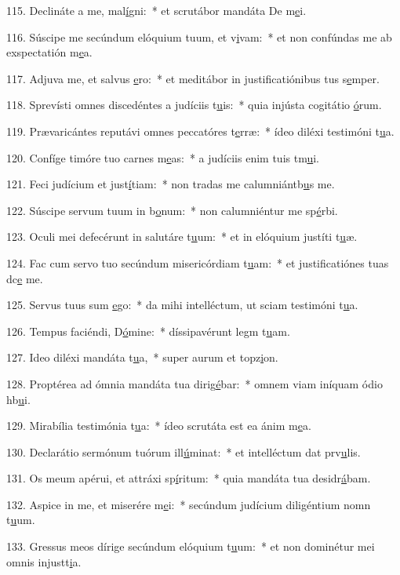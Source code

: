 115. Declináte a me, mal\uline{í}gni:~* et scrutábor mandáta De m\uline{e}i.\par 
116. Súscipe me secúndum elóquium tuum, et v\uline{i}vam:~* et non confúndas me ab exspectatión m\uline{e}a.\par 
117. Adjuva me, et salvus \uline{e}ro:~* et meditábor in justificatiónibus tus s\uline{e}mper.\par 
118. Sprevísti omnes discedéntes a judíciis t\uline{u}is:~* quia injústa cogitátio \uline{ó}rum.\par 
119. Prævaricántes reputávi omnes peccatóres t\uline{e}rræ:~* ídeo diléxi testimóni t\uline{u}a.\par 
120. Confíge timóre tuo carnes m\uline{e}as:~* a judíciis enim tuis tm\uline{u}i.\par 
121. Feci judícium et just\uline{í}tiam:~* non tradas me calumniántb\uline{u}s me.\par 
122. Súscipe servum tuum in b\uline{o}num:~* non calumniéntur me sp\uline{é}rbi.\par 
123. Oculi mei defecérunt in salutáre t\uline{u}um:~* et in elóquium justíti t\uline{u}æ.\par 
124. Fac cum servo tuo secúndum misericórdiam t\uline{u}am:~* et justificatiónes tuas dc\uline{e} me.\par 
125. Servus tuus sum \uline{e}go:~* da mihi intelléctum, ut sciam testimóni t\uline{u}a.\par 
126. Tempus faciéndi, D\uline{ó}mine:~* díssipavérunt legm t\uline{u}am.\par 
127. Ideo diléxi mandáta t\uline{u}a,~* super aurum et topz\uline{i}on.\par 
128. Proptérea ad ómnia mandáta tua dirig\uline{é}bar:~* omnem viam iníquam ódio hb\uline{u}i.\par 
129. Mirabília testimónia t\uline{u}a:~* ídeo scrutáta est ea ánim m\uline{e}a.\par 
130. Declarátio sermónum tuórum ill\uline{ú}minat:~* et intelléctum dat prv\uline{u}lis.\par 
131. Os meum apérui, et attráxi sp\uline{í}ritum:~* quia mandáta tua desidr\uline{á}bam.\par 
132. Aspice in me, et miserére m\uline{e}i:~* secúndum judícium diligéntium nomn t\uline{u}um.\par 
133. Gressus meos dírige secúndum elóquium t\uline{u}um:~* et non dominétur mei omnis injustt\uline{i}a.\par 
